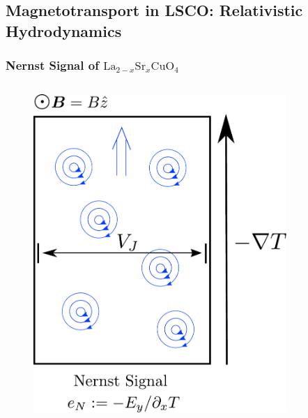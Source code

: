 \documentclass[10pt,aspectratio=43,xcolor=x11names,t]{beamer}%
\begin{document}
	\subsection{Magnetotransport in LSCO: Relativistic Hydrodynamics}
		\begin{frame}\frametitle{Nernst Signal of $\mathrm{La}_{2-x}\mathrm{Sr}_x\mathrm{CuO}_4$}
			\begin{columns}
				\begin{column}{0.3\textwidth}
					\begin{figure}[!htp]
						\centering
						\includegraphics[scale=0.25]{vortex.pdf}
					\end{figure}
				\end{column}
				\begin{column}{0.7\textwidth}
					\begin{figure}[!htp]
						\centering

\end{figure}
\end{column}
\end{columns}
\end{frame}
\end{document}
